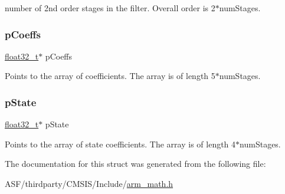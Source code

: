number of 2nd order stages in the filter. Overall order is 2$\ast$num\+Stages. \mbox{\label{structarm__biquad__casd__df1__inst__f32_aacbb8dd8eeba4b21fc2bb40076405ee3}} 
\subsubsection{\texorpdfstring{pCoeffs}{pCoeffs}}
{\footnotesize\ttfamily \mbox{\hyperlink{arm__math_8h_a4611b605e45ab401f02cab15c5e38715}{float32\+\_\+t}}$\ast$ p\+Coeffs}

Points to the array of coefficients. The array is of length 5$\ast$num\+Stages. \mbox{\label{structarm__biquad__casd__df1__inst__f32_a335c87e6fdc4b96601d95a5de8b9c463}} 
\subsubsection{\texorpdfstring{pState}{pState}}
{\footnotesize\ttfamily \mbox{\hyperlink{arm__math_8h_a4611b605e45ab401f02cab15c5e38715}{float32\+\_\+t}}$\ast$ p\+State}

Points to the array of state coefficients. The array is of length 4$\ast$num\+Stages. 

The documentation for this struct was generated from the following file\+:\begin{DoxyCompactItemize}
\item 
A\+S\+F/thirdparty/\+C\+M\+S\+I\+S/\+Include/\mbox{\hyperlink{arm__math_8h}{arm\+\_\+math.\+h}}\end{DoxyCompactItemize}
